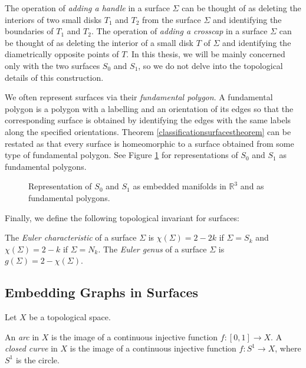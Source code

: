 The operation of \emph{adding a handle} in a surface $\Sigma$ can be thought of as deleting the 
interiors of two small  disks $T_1$ and $T_2$ from the surface $\Sigma$ and identifying
the boundaries of $T_1$ and $T_2$.
The operation of \emph{adding a crosscap} in a surface $\Sigma$ can be thought of as deleting the 
interior of a small disk $T$ of $\Sigma$ and identifying the diametrically opposite points of $T$.
In this thesis, we will be mainly concerned only with the two surfaces $S_0$ and $S_1$, so we 
do not delve into the topological details of this construction.

We often represent surfaces via their \emph{fundamental polygon}. A fundamental polygon is a 
polygon with a labelling and an orientation of its edges so that the corresponding surface is
obtained by identifying the edges with the same labels
along the specified orientations. Theorem \ref{classificationsurfacestheorem} can be restated
as that every surface is homeomorphic to a surface obtained from some type of fundamental
polygon. See Figure \ref{fig:spheretorusrepresentation} for representations of $S_0$ and $S_1$ as
fundamental polygons. 

\begin{figure}
\label{fig:spheretorusrepresentation}
\caption{Representation of $S_0$ and $S_1$ as embedded manifolds in $\mathbb{R}^3$ and as fundamental polygons.}
\end{figure}

Finally, we define the following topological invariant for surfaces:

\begin{definition}
The \emph{Euler characteristic} of a surface $\Sigma$ is $\chi(\Sigma) = 2 - 2k$ if $\Sigma = S_k$
and $\chi(\Sigma) = 2 - k$ if $\Sigma = N_k$. The \emph{Euler genus} of a surface $\Sigma$ is
$g(\Sigma) = 2 - \chi(\Sigma)$. 
\end{definition}

 

\subsection{Embedding Graphs in Surfaces}

Let $X$ be a topological space. 

\begin{definition}
An \emph{arc} in $X$ is the image of a continuous injective 
function $f : [0, 1] \rightarrow X$. A \emph{closed curve} in $X$ is the image
of a continuous injective function $f : S^1 \rightarrow X$, where $S^1$ is the circle.
\end{definition}

